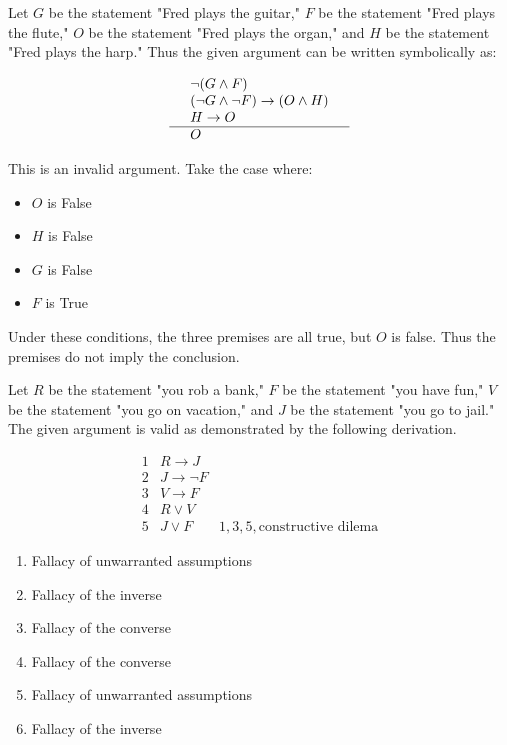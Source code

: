 \documentclass{article}
\theoremstyle{definition}
\begin{document}
	\vspace{0.25cm}

	\noindent {}  \vspace{0.2cm}

	Let $G$ be the statement "Fred plays the guitar," $F$ be the
	statement "Fred plays the flute," $O$ be the statement "Fred plays
	the organ," and $H$ be the statement "Fred plays the harp." Thus the
	given argument can be written symbolically as:

	$$\begin{array}{llr}
		  & \neg(G\wedge F) &\\
		  & (\neg G \wedge \neg F)\rightarrow (O\wedge H)&\\
		  & H\rightarrow O &\\\hline
		  & O &
	\end{array}$$



	This is an invalid argument. Take the case where:
	\begin{itemize}
		\item $O$ is False
		\item $H$ is False
		\item $G$ is False
		\item $F$ is True
	\end{itemize}
	Under these conditions, the three premises are all true, but $O$ is
	false. Thus the premises do not imply the conclusion.

	\vspace{0.25cm}

	\noindent {}  \vspace{0.2cm}

	Let $R$ be the statement "you rob a bank," $F$ be the statement "you
	have fun," $V$ be the statement "you go on vacation," and $J$ be the
	statement "you go to jail." The given argument is valid as
	demonstrated by the following derivation.

	$$\begin{array}{llr}
		  1  & R\rightarrow J &\\
		  2 & J \rightarrow \neg F&\\
		  3 & V\rightarrow F& \\
		  4 & R\vee V& \\\hline 5 & J\vee F & 1, 3, 5, \mbox{constructive
		  dilema}
	\end{array}$$


	\vspace{0.6cm}

	\noindent {}

	\begin{enumerate}
		\item Fallacy of unwarranted assumptions
		\item Fallacy of the inverse
		\item Fallacy of the converse
		\item Fallacy of the converse
		\item Fallacy of unwarranted assumptions
		\item Fallacy of the inverse
	\end{enumerate}
\end{document}
